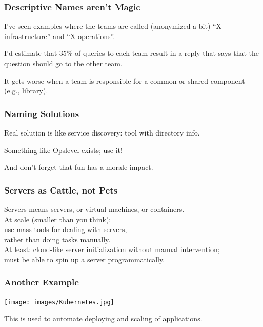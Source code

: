 \begin{frame}
\frametitle{Descriptive Names aren't Magic}

I've seen examples where the teams are called (anonymized a bit) ``X infrastructure'' and ``X operations''.

I'd estimate that 35\% of queries to each team result in a reply that says that the question should go to the other team. 

It gets worse when a team is responsible for a common or shared component (e.g., library). 

\end{frame}


\begin{frame}
\frametitle{Naming Solutions}

Real solution is like service discovery: tool with directory info.

Something like Opslevel exists; use it!

And don't forget that fun has a morale impact. 

\end{frame}

\begin{frame}
\frametitle{Servers as Cattle, not Pets}

\large

Servers means servers, or virtual machines, or containers.\\[1em]

At scale (smaller than you think):\\
use mass tools for dealing with servers, \\
rather than doing tasks manually. \\[1em]

At least: cloud-like server initialization without manual intervention;\\
must be able to spin up a server programmatically.


\end{frame}



\begin{frame}
\frametitle{Another Example}

\begin{center}
	\texttt{[image: images/Kubernetes.jpg]}
\end{center}

This is used to automate deploying and scaling of applications.

\end{frame}

